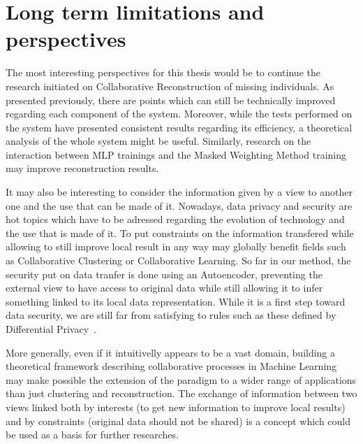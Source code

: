 \section{Long term limitations and perspectives}

The most interesting perspectives for this thesis would be to continue the research initiated on Collaborative Reconstruction of missing individuals. As presented previously, there are points which can still be technically improved regarding each component of the system. Moreover, while the tests performed on the system have presented consistent results regarding its efficiency, a theoretical analysis of the whole system might be useful. Similarly, research on the interaction between MLP trainings and the Masked Weighting Method training may improve reconstruction results.

It may also be interesting to consider the information given by a view to another one and the use that can be made of it. Nowadays, data privacy and security are hot topics which have to be adressed regarding the evolution of technology and the use that is made of it. To put constraints on the information transfered while allowing to still improve local result in any way may globally benefit fields such as Collaborative Clustering or Collaborative Learning. So far in our method, the security put on data tranfer is done using an Autoencoder, preventing the external view to have access to original data while still allowing it to infer something linked to its local data representation. While it is a first step toward data security, we are still far from satisfying to rules such as these defined by Differential Privacy~\cite{dwork2010differential}.

More generally, even if it intuitivelly appears to be a vast domain, building a theoretical framework describing collaborative processes in Machine Learning may make possible the extension of the paradigm to a wider range of applications than just clustering and reconstruction. The exchange of information between two views linked both by interests (to get new information to improve local results) and by constraints (original data should not be shared) is a concept which could be used as a basis for further researches.

